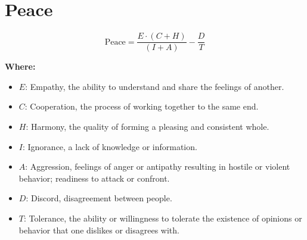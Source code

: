 \chapter{Peace}

\begin{equation}
\text{Peace} = \frac{E \cdot (C + H)}{(I + A)} - \frac{D}{T}
\end{equation}

\textbf{Where:}

\begin{itemize}
    \item $E$: Empathy, the ability to understand and share the feelings of another.
    \item $C$: Cooperation, the process of working together to the same end.
    \item $H$: Harmony, the quality of forming a pleasing and consistent whole.
    \item $I$: Ignorance, a lack of knowledge or information.
    \item $A$: Aggression, feelings of anger or antipathy resulting in hostile or violent behavior; readiness to attack or confront.
    \item $D$: Discord, disagreement between people.
    \item $T$: Tolerance, the ability or willingness to tolerate the existence of opinions or behavior that one dislikes or disagrees with.
\end{itemize}